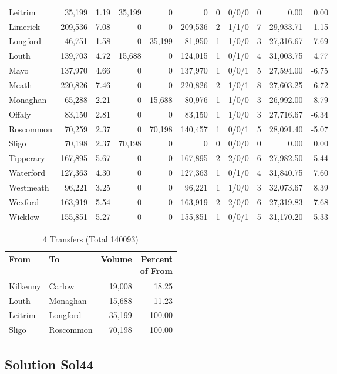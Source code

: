 \documentclass[a4paper]{article}
\begin{document}
\begin{longtable}{lrrrrrrlrrr}
Leitrim&35,199& 1.19&35,199&0&0&0&0/0/0&0& 0.00& 0.00\\ 
Limerick&209,536& 7.08&0&0&209,536&2&1/1/0&7&29,933.71& 1.15\\ 
Longford&46,751& 1.58&0&35,199&81,950&1&1/0/0&3&27,316.67&-7.69\\ 
Louth&139,703& 4.72&15,688&0&124,015&1&0/1/0&4&31,003.75& 4.77\\ 
Mayo&137,970& 4.66&0&0&137,970&1&0/0/1&5&27,594.00&-6.75\\ 
Meath&220,826& 7.46&0&0&220,826&2&1/0/1&8&27,603.25&-6.72\\ 
Monaghan&65,288& 2.21&0&15,688&80,976&1&1/0/0&3&26,992.00&-8.79\\ 
Offaly&83,150& 2.81&0&0&83,150&1&1/0/0&3&27,716.67&-6.34\\ 
Roscommon&70,259& 2.37&0&70,198&140,457&1&0/0/1&5&28,091.40&-5.07\\ 
Sligo&70,198& 2.37&70,198&0&0&0&0/0/0&0& 0.00& 0.00\\ 
Tipperary&167,895& 5.67&0&0&167,895&2&2/0/0&6&27,982.50&-5.44\\ 
Waterford&127,363& 4.30&0&0&127,363&1&0/1/0&4&31,840.75& 7.60\\ 
Westmeath&96,221& 3.25&0&0&96,221&1&1/0/0&3&32,073.67& 8.39\\ 
Wexford&163,919& 5.54&0&0&163,919&2&2/0/0&6&27,319.83&-7.68\\ 
Wicklow&155,851& 5.27&0&0&155,851&1&0/0/1&5&31,170.20& 5.33\\ 
\end{longtable}

\begin{table}[htbp]
\caption{4 Transfers (Total 140093)}
\centering
\begin{tabular}{llrr} \toprule
From &To &Volume &\shortstack{Percent\\of From} \\ \midrule
Kilkenny&Carlow&19,008&18.25\\ 
Louth&Monaghan&15,688&11.23\\ 
Leitrim&Longford&35,199&100.00\\ 
Sligo&Roscommon&70,198&100.00\\ 
\bottomrule
\end{tabular}
\end{table}

\clearpage
\subsection{Solution Sol44}
\end{document}

